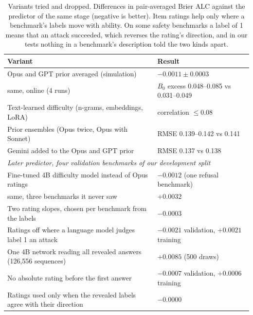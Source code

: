 \documentclass{article}
\begin{document}
\begin{table}[h]
\centering
\caption{Variants tried and dropped. Differences in pair-averaged Brier ALC against the predictor of the same stage (negative is better). Item ratings help only where a benchmark's labels move with ability. On some safety benchmarks a label of 1 means that an attack succeeded, which reverses the rating's direction, and in our tests nothing in a benchmark's description told the two kinds apart.}
\label{tab:neg}
\footnotesize
\begin{tabular}{ll}
\toprule
Variant & Result \\
\midrule
Opus and GPT prior averaged (simulation) & $-0.0011 \pm 0.0003$ \\
\quad same, online (4 runs) & $B_0$ excess 0.048--0.085 vs 0.031--0.049 \\
Text-learned difficulty (n-grams, embeddings, LoRA) & correlation $\le 0.08$ \\
Prior ensembles (Opus twice, Opus with Sonnet) & RMSE 0.139--0.142 vs 0.141 \\
Gemini added to the Opus and GPT prior & RMSE 0.137 vs 0.138 \\
\midrule
\multicolumn{2}{l}{\emph{Later predictor, four validation benchmarks of our development split}} \\
Fine-tuned 4B difficulty model instead of Opus ratings & $-0.0012$ (one refusal benchmark) \\
\quad same, three benchmarks it never saw & $+0.0032$ \\
Two rating slopes, chosen per benchmark from the labels & $-0.0003$ \\
Ratings off where a language model judges label 1 an attack & $-0.0021$ validation, $+0.0021$ training \\
One 4B network reading all revealed answers (126,556 sequences) & $+0.0085$ (500 draws) \\
No absolute rating before the first answer & $-0.0007$ validation, $+0.0006$ training \\
Ratings used only when the revealed labels agree with their direction & $-0.0000$ \\
\bottomrule
\end{tabular}
\end{table}
\end{document}
